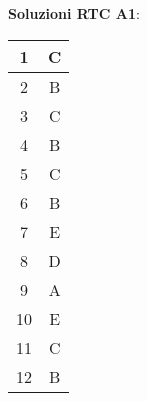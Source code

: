 \documentclass{article}
\begin{document}
\pagestyle{empty}

\textbf{Soluzioni RTC A1}:

\vspace{0.35cm}
\begin{tabular}{ | c | c | }
	
	\hline
	1 & C \\

	\hline
	2 & B \\

	\hline
	3 & C \\

	\hline
	4 & B \\

	\hline
	5 & C \\

	\hline
	6 & B \\

	\hline
	7 & E \\

	\hline
	8 & D \\

	\hline
	9 & A \\

	\hline
	10 & E \\

	\hline
	11 & C \\
	
	\hline
	12 & B \\

	\hline

\end{tabular}
\end{document}

